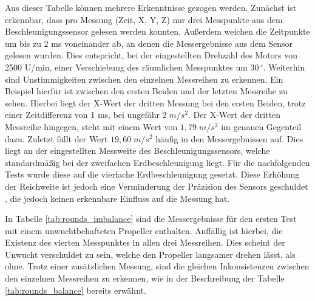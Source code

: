 Aus dieser Tabelle können mehrere Erkenntnisse gezogen werden.
Zunächst ist erkennbar, dass pro Messung (Zeit, X, Y, Z) nur drei Messpunkte aus dem Beschleunigungssensor gelesen werden konnten.
Außerdem weichen die Zeitpunkte um bis zu 2 \ac{ms} voneinander ab, an denen die Messergebnisse aus dem Sensor gelesen wurden.
Dies entspricht, bei der eingestellten Drehzahl des Motors von 2500 U/min, einer Verschiebung des räumlichen Messpunktes um 30$\,^\circ$.
Weiterhin sind Unstimmigkeiten zwischen den einzelnen Messreihen zu erkennen.
Ein Beispiel hierfür ist zwischen den ersten Beiden und der letzten Messreihe zu sehen.
Hierbei liegt der X-Wert der dritten Messung bei den ersten Beiden, trotz einer Zeitdifferenz von 1 \ac{ms}, bei ungefähr $2\;m/s^2$.
Der X-Wert der dritten Messreihe hingegen, steht mit einem Wert von $1,79\;m/s^2$ im genauen Gegenteil dazu.
Zuletzt fällt der Wert $19,60\;m/s^2$ häufig in den Messergebnissen auf.
Dies liegt an der eingestellten Messweite des Beschleunigungssensors, welche standardmäßig bei der zweifachen Erdbeschleunigung liegt.
Für die nachfolgenden Tests wurde diese auf die vierfache Erdbeschleunigung gesetzt.
Diese Erhöhung der Reichweite ist jedoch eine Verminderung der Präzision des Sensors geschuldet \cite{lsm9ds1_manual}, die jedoch keinen erkennbare Einfluss auf die Messung hat.

In Tabelle \ref{tab:rounds_imbalance} sind die Messergebnisse für den ersten Test mit einem unwuchtbehafteten Propeller enthalten.
Auffällig ist hierbei, die Existenz des vierten Messpunktes in allen drei Messreihen.
Dies scheint der Unwucht verschuldet zu sein, welche den Propeller langsamer drehen lässt, als ohne.
Trotz einer zusätzlichen Messung, sind die gleichen Inkonsistenzen zwischen den einzelnen Messreihen zu erkennen, wie in der Beschreibung der Tabelle \ref{tab:rounds_balance} bereits erwähnt.

\begin{table}[H]
\centering
{}
\caption{Messergebnisse von Propellerumdrehungen mit Unwucht}
\label{tab:rounds_imbalance}
\end{table}

